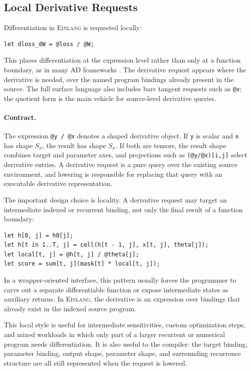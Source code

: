 \documentclass[sigplan,screen,nonacm]{acmart}
\newcommand{\einlang}{\textsc{Einlang}}
\begin{document}
\subsection{Local Derivative Requests}

Differentiation in \einlang{} is requested locally:

\begin{lstlisting}[style=einlang]
let dloss_dW = @loss / @W;
\end{lstlisting}

This places differentiation at the expression level rather than only at a function boundary, as in many AD frameworks \cite{tensorflow2016,pytorch2019,jax2018,baydin2018}. The derivative request appears where the derivative is needed, over the named program bindings already present in the source. The full surface language also includes bare tangent requests such as \texttt{@x}; the quotient form is the main vehicle for source-level derivative queries.

\paragraph{Contract.}
The expression \texttt{@y / @x} denotes a shaped derivative object. If \texttt{y} is scalar and \texttt{x} has shape $S_x$, the result has shape $S_x$. If both are tensors, the result shape combines target and parameter axes, and projections such as \texttt{(@y/@x)[i,j]} select derivative entries. A derivative request is a pure query over the existing source environment, and lowering is responsible for replacing that query with an executable derivative representation.

The important design choice is locality. A derivative request may target an intermediate indexed or recurrent binding, not only the final result of a function boundary:
\begin{lstlisting}[style=einlang]
let h[0, j] = h0[j];
let h[t in 1..T, j] = cell(h[t - 1, j], x[t, j], theta[j]);
let local[t, j] = @h[t, j] / @theta[j];
let score = sum[t, j](mask[t] * local[t, j]);
\end{lstlisting}
In a wrapper-oriented interface, this pattern usually forces the programmer to carve out a separate differentiable function or expose intermediate states as auxiliary returns. In \einlang{}, the derivative is an expression over bindings that already exist in the indexed source program.

This local style is useful for intermediate sensitivities, custom optimization steps, and mixed workloads in which only part of a larger recurrent or numerical program needs differentiation. It is also useful to the compiler: the target binding, parameter binding, output shape, parameter shape, and surrounding recurrence structure are all still represented when the request is lowered.
\end{document}
